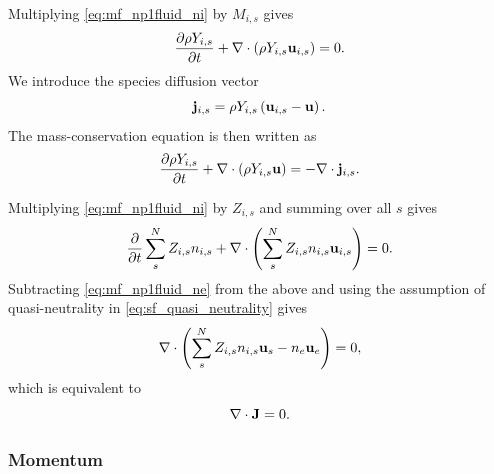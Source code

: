 \documentclass[a4paper,11pt]{report}
\begin{document}
Multiplying \cref{eq:mf_np1fluid_ni} by $M_{i,s}$ gives
\begin{equation*}
    \frac{\partial \rho Y_{i,s}}{\partial t} + \nabla \cdot \left( \rho Y_{i,s} \mathbf{u}_{i,s} \right) = 0.
\end{equation*}
We introduce the species diffusion vector
\begin{equation}
    \label{eq:sf_species_diffusion_vector}
    \mathbf{j}_{i,s} = \rho Y_{i,s} \left( \mathbf{u}_{i,s} - \mathbf{u} \right).
\end{equation}
The mass-conservation equation is then written as
\begin{equation}
    \frac{\partial \rho Y_{i,s}}{\partial t} + \nabla \cdot \left( \rho Y_{i,s} \mathbf{u} \right) = -\nabla \cdot \mathbf{j}_{i,s}.
\end{equation}

Multiplying \cref{eq:mf_np1fluid_ni} by $Z_{i,s}$ and summing over all $s$ gives
\begin{equation*}
    \frac{\partial}{\partial t} \sum_s^N Z_{i,s} n_{i,s} + \nabla \cdot \left( \sum_s^N Z_{i,s} n_{i,s} \mathbf{u}_{i,s} \right) = 0.
\end{equation*}
Subtracting \cref{eq:mf_np1fluid_ne} from the above and using the assumption of quasi-neutrality in \cref{eq:sf_quasi_neutrality} gives
\begin{equation*}
    \nabla \cdot \left( \sum_s^N Z_{i,s} n_{i,s} \mathbf{u}_s - n_e \mathbf{u}_e \right) = 0,
\end{equation*}
which is equivalent to
\begin{equation}
    \nabla \cdot \mathbf{J} = 0.
\end{equation}

\subsubsection{Momentum}
\end{document}
